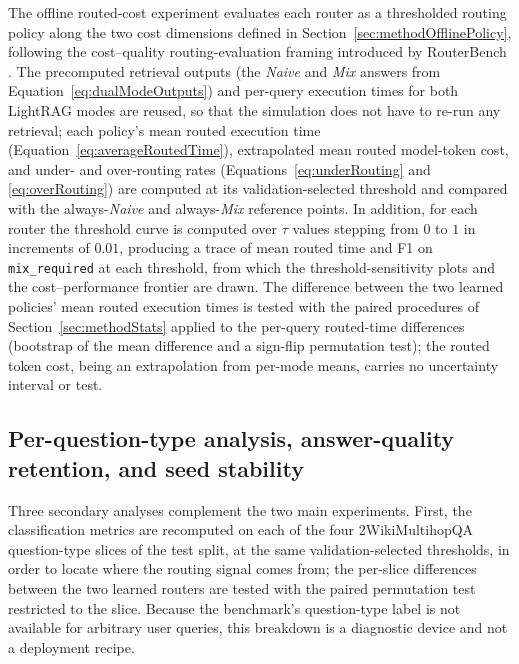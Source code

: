 \documentclass[english, bibtex]{kththesis}               %
\numberwithin{listing}{chapter}
\begin{document}
The offline routed-cost experiment evaluates each router as a thresholded routing policy along the two cost dimensions defined in Section~\ref{sec:methodOfflinePolicy}, following the cost--quality routing-evaluation framing introduced by RouterBench \cite{hu2024routerbench}. The precomputed retrieval outputs (the \emph{Naive} and \emph{Mix} answers from Equation~\ref{eq:dualModeOutputs}) and per-query execution times for both LightRAG modes are reused, so that the simulation does not have to re-run any retrieval; each policy's mean routed execution time (Equation~\ref{eq:averageRoutedTime}), extrapolated mean routed model-token cost, and under- and over-routing rates (Equations~\ref{eq:underRouting} and \ref{eq:overRouting}) are computed at its validation-selected threshold and compared with the always-\emph{Naive} and always-\emph{Mix} reference points. In addition, for each router the threshold curve is computed over $\tau$ values stepping from $0$ to $1$ in increments of $0.01$, producing a trace of mean routed time and F1 on \texttt{mix\_required} at each threshold, from which the threshold-sensitivity plots and the cost--performance frontier are drawn. The difference between the two learned policies' mean routed execution times is tested with the paired procedures of Section~\ref{sec:methodStats} applied to the per-query routed-time differences (bootstrap of the mean difference and a sign-flip permutation test); the routed token cost, being an extrapolation from per-mode means, carries no uncertainty interval or test.

\subsection{Per-question-type analysis, answer-quality retention, and seed stability}
\label{sec:methodSecondary}

Three secondary analyses complement the two main experiments. First, the classification metrics are recomputed on each of the four 2WikiMultihopQA question-type slices of the test split, at the same validation-selected thresholds, in order to locate where the routing signal comes from; the per-slice differences between the two learned routers are tested with the paired permutation test restricted to the slice. Because the benchmark's question-type label is not available for arbitrary user queries, this breakdown is a diagnostic device and not a deployment recipe.
\end{document}
